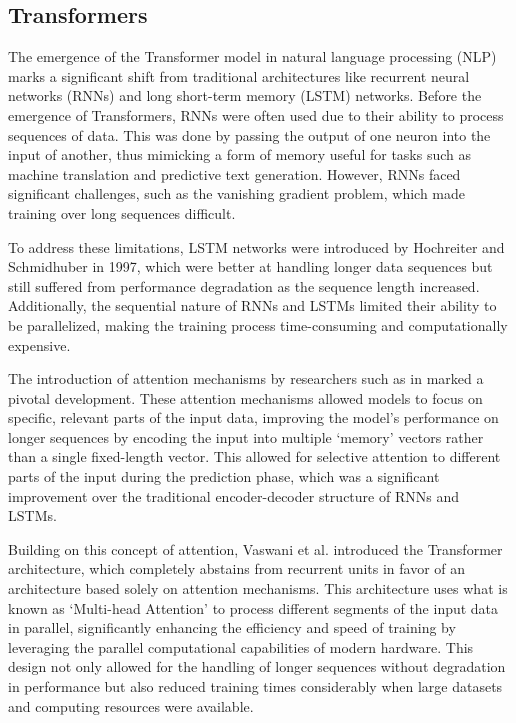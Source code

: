 \documentclass[a4paper,12pt]{article}
\begin{document}
\subsection{Transformers}
The emergence of the Transformer model in natural language processing (NLP) marks a significant shift from traditional architectures like recurrent neural networks (RNNs) and long short-term memory (LSTM) networks. Before the emergence of Transformers, RNNs were often used due to their ability to process sequences of data. This was done by passing the output of one neuron into the input of another, thus mimicking a form of memory useful for tasks such as machine translation and predictive text generation. However, RNNs faced significant challenges, such as the vanishing gradient problem, which made training over long sequences difficult.

To address these limitations, LSTM networks were introduced by Hochreiter and Schmidhuber in 1997, which were better at handling longer data sequences but still suffered from performance degradation as the sequence length increased. Additionally, the sequential nature of RNNs and LSTMs limited their ability to be parallelized, making the training process time-consuming and computationally expensive.

The introduction of attention mechanisms by researchers such as in marked a pivotal development. These attention mechanisms allowed models to focus on specific, relevant parts of the input data, improving the model’s performance on longer sequences by encoding the input into multiple ‘memory’ vectors rather than a single fixed-length vector. This allowed for selective attention to different parts of the input during the prediction phase, which was a significant improvement over the traditional encoder-decoder structure of RNNs and LSTMs.

Building on this concept of attention, Vaswani et al. introduced the Transformer architecture, which completely abstains from recurrent units in favor of an architecture based solely on attention mechanisms. This architecture uses what is known as ‘Multi-head Attention’ to process different segments of the input data in parallel, significantly enhancing the efficiency and speed of training by leveraging the parallel computational capabilities of modern hardware. This design not only allowed for the handling of longer sequences without degradation in performance but also reduced training times considerably when large datasets and computing resources were available.
\end{document}
